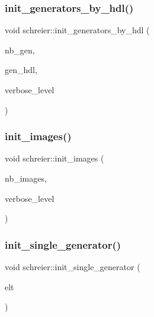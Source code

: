 \mbox{\label{classschreier_a9adf1976cee6d540a36d3a0a1bd887ba}} 
\subsubsection{\texorpdfstring{init\+\_\+generators\+\_\+by\+\_\+hdl()}{init\_generators\_by\_hdl()}}
{\footnotesize\ttfamily void schreier\+::init\+\_\+generators\+\_\+by\+\_\+hdl (\begin{DoxyParamCaption}\item[{\mbox{\hyperlink{galois_8h_a09fddde158a3a20bd2dcadb609de11dc}{I\+NT}}}]{nb\+\_\+gen,  }\item[{\mbox{\hyperlink{galois_8h_a09fddde158a3a20bd2dcadb609de11dc}{I\+NT}} $\ast$}]{gen\+\_\+hdl,  }\item[{\mbox{\hyperlink{galois_8h_a09fddde158a3a20bd2dcadb609de11dc}{I\+NT}}}]{verbose\+\_\+level }\end{DoxyParamCaption})}

\mbox{\label{classschreier_a18706665fcf3e66a503373f2eef8fe21}} 
\subsubsection{\texorpdfstring{init\+\_\+images()}{init\_images()}}
{\footnotesize\ttfamily void schreier\+::init\+\_\+images (\begin{DoxyParamCaption}\item[{\mbox{\hyperlink{galois_8h_a09fddde158a3a20bd2dcadb609de11dc}{I\+NT}}}]{nb\+\_\+images,  }\item[{\mbox{\hyperlink{galois_8h_a09fddde158a3a20bd2dcadb609de11dc}{I\+NT}}}]{verbose\+\_\+level }\end{DoxyParamCaption})}

\mbox{\label{classschreier_a6f04f2e67ec0f25135b064579a0fad32}} 
\subsubsection{\texorpdfstring{init\+\_\+single\+\_\+generator()}{init\_single\_generator()}}
{\footnotesize\ttfamily void schreier\+::init\+\_\+single\+\_\+generator (\begin{DoxyParamCaption}\item[{\mbox{\hyperlink{galois_8h_a09fddde158a3a20bd2dcadb609de11dc}{I\+NT}} $\ast$}]{elt }\end{DoxyParamCaption})}

